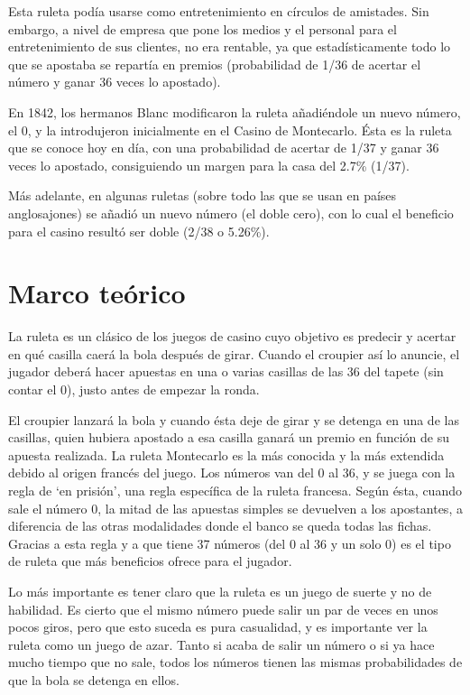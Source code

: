 Esta ruleta podía usarse como entretenimiento en círculos de amistades. Sin embargo, a nivel de empresa que pone los medios y el personal para el entretenimiento de sus clientes, no era rentable, ya que estadísticamente todo lo que se apostaba se repartía en premios (probabilidad de 1/36 de acertar el número y ganar 36 veces lo apostado).

En 1842, los hermanos Blanc modificaron la ruleta añadiéndole un nuevo número, el 0, y la introdujeron inicialmente en el Casino de Montecarlo. Ésta es la ruleta que se conoce hoy en día, con una probabilidad de acertar de 1/37 y ganar 36 veces lo apostado, consiguiendo un margen para la casa del 2.7\% (1/37).

Más adelante, en algunas ruletas (sobre todo las que se usan en países anglosajones) se añadió un nuevo número (el doble cero), con lo cual el beneficio para el casino resultó ser doble (2/38 o 5.26\%).

\section{Marco teórico}
La ruleta es un clásico de los juegos de casino cuyo objetivo es predecir y acertar en qué casilla caerá la bola después de girar. Cuando el croupier así lo anuncie, el jugador deberá hacer apuestas en una o varias casillas de las 36 del tapete (sin contar el 0), justo antes de empezar la ronda.

El croupier lanzará la bola y cuando ésta deje de girar y se detenga en una de las casillas, quien hubiera apostado a esa casilla ganará un premio en función de su apuesta realizada.
La ruleta Montecarlo es la más conocida y la más extendida debido al origen francés del juego. Los números van del 0 al 36, y se juega con la regla de ‘en prisión’, una regla específica de la ruleta francesa. Según ésta, cuando sale el número 0, la mitad de las apuestas simples se devuelven a los apostantes, a diferencia de las otras modalidades donde el banco se queda todas las fichas. Gracias a esta regla y a que tiene 37 números (del 0 al 36 y un solo 0) es el tipo de ruleta que más beneficios ofrece para el jugador.

Lo más importante es tener claro que la ruleta es un juego de suerte y no de habilidad. Es cierto que el mismo número puede salir un par de veces en unos pocos giros, pero que esto suceda es pura casualidad, y es importante ver la ruleta como un juego de azar. Tanto si acaba de salir un número o si ya hace mucho tiempo que no sale, todos los números tienen las mismas probabilidades de que la bola se detenga en ellos. 

